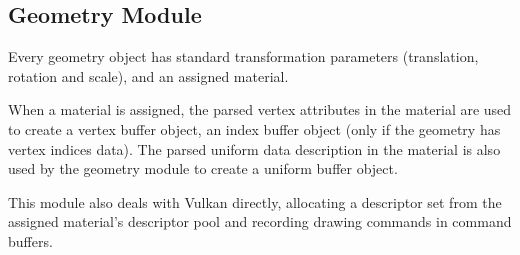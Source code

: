 \subsection{Geometry Module}
Every geometry object has standard transformation parameters (translation, rotation and scale), and an assigned material.

When a material is assigned, the parsed vertex attributes in the material are used to create a vertex buffer object, an index buffer object (only if the geometry has vertex indices data). The parsed uniform data description in the material is also used by the geometry module to create a uniform buffer object.

This module also deals with Vulkan directly, allocating a descriptor set from the assigned material's descriptor pool and recording drawing commands in command buffers.
